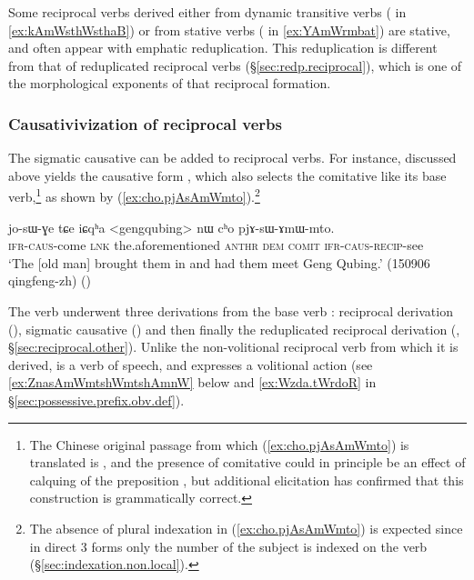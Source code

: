 Some reciprocal verbs derived either from dynamic transitive verbs ( in \ref{ex:kAmWsthWsthaB}) or from stative verbs ( in \ref{ex:YAmWrmbat}) are stative, and often appear with emphatic reduplication. This reduplication is different from that of reduplicated reciprocal verbs (§\ref{sec:redp.reciprocal}), which is one of the morphological exponents of that reciprocal formation.

\subsubsection{Causativivization of  reciprocal verbs} \label{sec:sAmW}
The sigmatic causative can be added to  reciprocal verbs. For instance,  discussed above yields the causative form , which also selects the comitative like its base verb,\footnote{The Chinese original passage from which (\ref{ex:cho.pjAsAmWmto}) is translated is , and the presence of comitative could in principle be an effect of calquing of the preposition , but additional elicitation has confirmed that this construction is grammatically correct. }
 as shown by (\ref{ex:cho.pjAsAmWmto}).\footnote{The absence of plural indexation in (\ref{ex:cho.pjAsAmWmto}) is expected since in direct 3\flobv{} forms only the number of the subject is indexed on the verb (§\ref{sec:indexation.non.local}). }


\begin{exe}
\ex \label{ex:cho.pjAsAmWmto}
\gll jo-sɯ-ɣe tɕe iɕqʰa <gengqubing> nɯ cʰo pjɤ-sɯ-ɤmɯ-mto.  \\
\textsc{ifr}-\textsc{caus}-come \textsc{lnk} the.aforementioned  \textsc{anthr} \textsc{dem} \textsc{comit} \textsc{ifr}-\textsc{caus}-\textsc{recip}-see \\
\glt `The [old man] brought them in and had them meet Geng Qubing.' (150906 qingfeng-zh) 
()
\end{exe}

The verb  underwent three derivations from the base verb :  reciprocal derivation (), sigmatic causative () and then finally the reduplicated reciprocal derivation (, §\ref{sec:reciprocal.other}). Unlike the non-volitional reciprocal verb  from which it is derived,  is a verb of speech, and expresses a volitional action (see \ref{ex:ZnasAmWmtshWmtshAmnW} below and \ref{ex:Wzda.tWrdoR} in §\ref{sec:possessive.prefix.obv.def}). 

